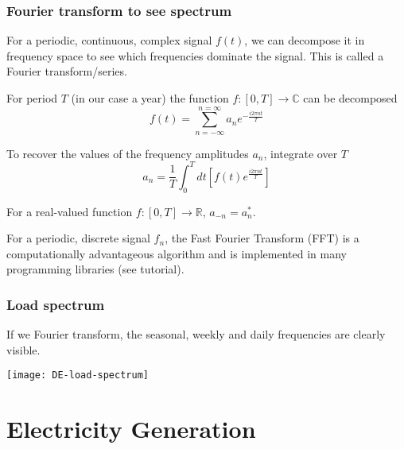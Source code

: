 \documentclass[10pt,aspectratio=169,dvipsnames]{beamer}
\begin{document}
\begin{frame}
  \frametitle{Fourier transform to see spectrum}

  For a periodic, continuous, complex signal $f(t)$, we can decompose it in  frequency space to see which frequencies dominate the signal. This is called a \alert{Fourier transform/series}.

  For period $T$ (in our case a year) the function $f: [0,T] \rightarrow \mathbb{C}$ can be decomposed
  \begin{equation*}
     f(t) = \sum_{n=-\infty}^{n=\infty} a_n e^{-\frac{i2\pi nt}{T}}
  \end{equation*}

  To recover the values of the \alert{frequency amplitudes} $a_n$, integrate over $T$
  \begin{equation*}
     a_n = \frac{1}{T} \int_0^T dt \left[ f(t)  e^{\frac{i2\pi nt}{T}} \right]
  \end{equation*}


  For a real-valued function $f: [0,T] \rightarrow \mathbb{R}$, $a_{-n} = a_n^*$.

  For a periodic, \alert{discrete} signal $f_n$, the \alert{Fast Fourier Transform} (FFT) is a computationally advantageous algorithm and is implemented in many programming libraries (see tutorial).

\end{frame}

\begin{frame}
  \frametitle{Load spectrum}

  If we Fourier transform, the \alert{seasonal}, \alert{weekly} and \alert{daily} frequencies are clearly visible.

  \centering
  \texttt{[image: DE-load-spectrum]}

\end{frame}



\section{Electricity Generation}
\end{document}
